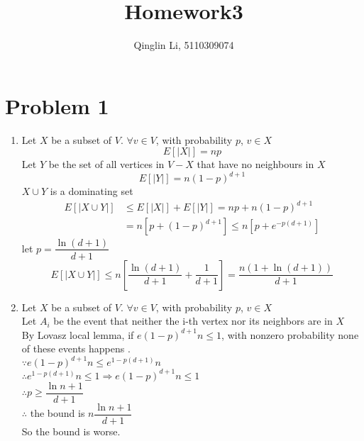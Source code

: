 \documentclass[12pt]{article}
\date{}
\title{Homework3}
\author{Qinglin Li, 5110309074}
\begin{document}
\maketitle
\section*{Problem 1}
\begin{enumerate}
\item
Let $X$ be a subset of $V$. $\forall v\in V$, with probability $p$, $v \in X$\\
$$E[|X|]=np$$
Let $Y$ be the set of all vertices in $V-X$ that have no neighbours in $X$\\
$$E[|Y|]=n(1-p)^{d+1}$$
$X\cup Y$ is a dominating set\\
\begin{align*}
E[|X\cup Y|]&\leq E[|X|]+E[|Y|]=np+n(1-p)^{d+1}\\
&= n\left[p+(1-p)^{d+1}\right] \leq n\left[p+e^{-p(d+1)}\right]
\end{align*}
let $p=\dfrac{\ln(d+1)}{d+1}$
$$E[|X\cup Y|]\leq n\left[\dfrac{\ln(d+1)}{d+1}+\dfrac{1}{d+1	}\right]=\dfrac{n(1+\ln(d+1))}{d+1}$$
\item
Let $X$ be a subset of $V$. $\forall v\in V$, with probability $p$, $v \in X$\\
Let  $A_i$ be the event that neither the i-th vertex nor its neighbors are in $X$\\
By Lovasz local lemma, if $e(1-p)^{d+1}n\leq 1$, with nonzero probability none of these events happens .\\
$\because e(1-p)^{d+1}n\leq e^{1-p(d+1)}n$\\
$\therefore  e^{1-p(d+1)}n\leq 1 \Rightarrow e(1-p)^{d+1}n\leq 1$\\
$\therefore p\geq \dfrac{\ln n+1}{d+1}$\\
$\therefore$ the bound is $n\dfrac{\ln n+1}{d+1}$\\
So the bound is worse.\\
\end{enumerate}
\end{document}

